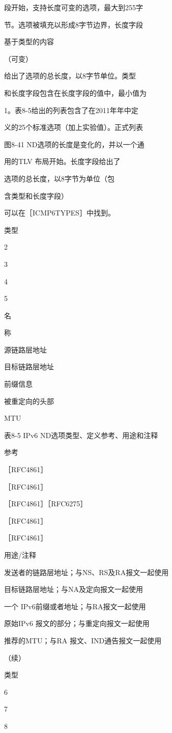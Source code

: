段开始，支持长度可变的选项，最大到255字

节。选项被填充以形成8字节边界，长度字段

基于类型的内容

（可变）

给出了选项的总长度，以8字节单位。类型

和长度字段包含在长度字段的值中，最小值为

1。表8-5给出的列表包含了在2011年年中定

义的25个标准选项（加上实验值）。正式列表

图8-41 ND选项的长度是变化的，并以一个通

用的TLV 布局开始。长度字段给出了

选项的总长度，以8字节为单位（包

含类型和长度字段）

可以在［ICMP6TYPES］中找到。

类型

2

3

4

5

名

称

源链路层地址

目标链路层地址

前缀信息

被重定向的头部

MTU

表8-5 IPv6 ND选项类型、定义参考、用途和注释

参考

［RFC4861］

［RFC4861］

［RFC4861］［RFC6275］

［RFC4861］

［RFC4861］

用途/注释

发送者的链路层地址；与NS、RS及RA报文一起使用

目标链路层地址；与NA及定向报文一起使用

一个 IPv6前缀或者地址；与RA报文一起使用

原始IPv6 报文的部分；与重定向报文一起使用

推荐的MTU；与RA 报文、IND通告报文一起使用

（续）

类型

6

7

8


